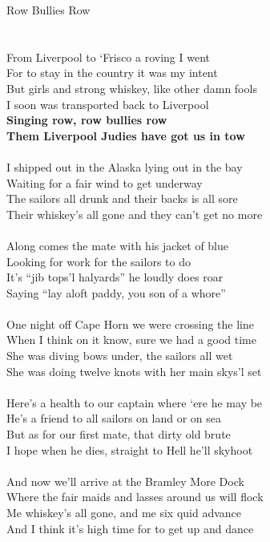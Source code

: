 \documentclass[letterpaper,9pt]{article}
\begin{document}
\newpage
{}
\huge
Row Bullies Row\\
\\
\Large
\noindent
\\From Liverpool to ‘Frisco a roving I went
\\For to stay in the country it was my intent
\\But girls and strong whiskey, like other damn fools
\\I soon was transported back to Liverpool 
\\\textbf{Singing row, row bullies row
\\Them Liverpool Judies have got us in tow}
\\
\\I shipped out in the Alaska lying out in the bay
\\Waiting for a fair wind to get underway
\\The sailors all drunk and their backs is all sore
\\Their whiskey’s all gone and they can’t get no more
\\
\\Along comes the mate with his jacket of blue
\\Looking for work for the sailors to do
\\It’s “jib tops’l halyards” he loudly does roar
\\Saying “lay aloft paddy, you son of a whore”
\\
\\One night off Cape Horn we were crossing the line
\\When I think on it know, sure we had a good time
\\She was diving bows under, the sailors all wet
\\She was doing twelve knots with her main skys’l set
\\
\\Here’s a health to our captain where ‘ere he may be
\\He’s a friend to all sailors on land or on sea
\\But as for our first mate, that dirty old brute
\\I hope when he dies, straight to Hell he’ll skyhoot
\\
\\And now we’ll arrive at the Bramley More Dock
\\Where the fair maids and lasses around us will flock
\\Me whiskey’s all gone, and me six quid advance
\\And I think it’s high time for to get up and dance
\end{document}
